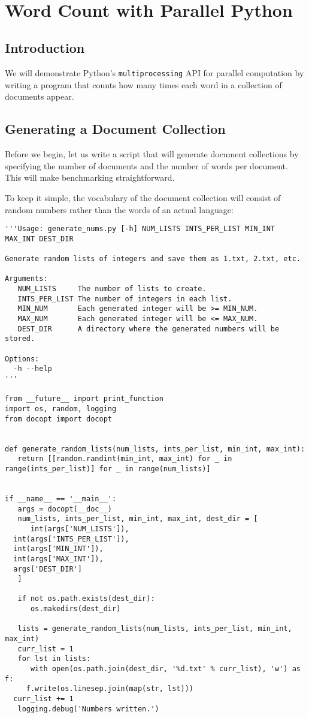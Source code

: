 \FILENAME\
\section{Word Count with Parallel Python}\label{word-count-1-parallel-python}

\subsection{Introduction}

We will demonstrate Python's \texttt{multiprocessing} API
for parallel computation by writing a program that counts how many times
each word in a collection of documents appear.

\subsection{Generating a Document Collection}

Before we begin, let us write a script that will generate document
collections by specifying the number of documents and the number of
words per document. This will make benchmarking straightforward.

To keep it simple, the vocabulary of the document collection will
consist of random numbers rather than the words of an actual language:

\begin{lstlisting}
'''Usage: generate_nums.py [-h] NUM_LISTS INTS_PER_LIST MIN_INT MAX_INT DEST_DIR

Generate random lists of integers and save them as 1.txt, 2.txt, etc.

Arguments:
   NUM_LISTS     The number of lists to create.
   INTS_PER_LIST The number of integers in each list.
   MIN_NUM       Each generated integer will be >= MIN_NUM.
   MAX_NUM       Each generated integer will be <= MAX_NUM.
   DEST_DIR      A directory where the generated numbers will be stored.

Options:
  -h --help
'''

from __future__ import print_function
import os, random, logging
from docopt import docopt


def generate_random_lists(num_lists, ints_per_list, min_int, max_int):
   return [[random.randint(min_int, max_int) for _ in range(ints_per_list)] for _ in range(num_lists)]


if __name__ == '__main__':
   args = docopt(__doc__)
   num_lists, ints_per_list, min_int, max_int, dest_dir = [
      int(args['NUM_LISTS']),
  int(args['INTS_PER_LIST']),
  int(args['MIN_INT']),
  int(args['MAX_INT']),
  args['DEST_DIR']
   ]

   if not os.path.exists(dest_dir):
      os.makedirs(dest_dir)

   lists = generate_random_lists(num_lists, ints_per_list, min_int, max_int)
   curr_list = 1
   for lst in lists:
      with open(os.path.join(dest_dir, '%d.txt' % curr_list), 'w') as f:
     f.write(os.linesep.join(map(str, lst)))
  curr_list += 1
   logging.debug('Numbers written.')
\end{lstlisting}

